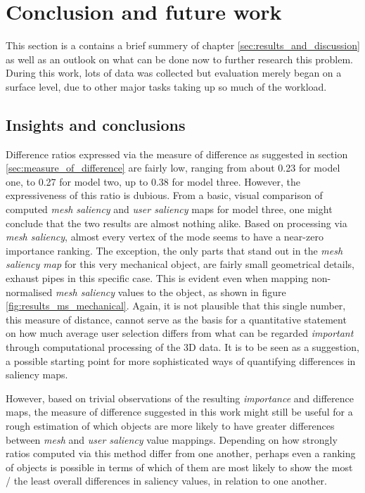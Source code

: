 \chapter{Conclusion and future work}
\label{sec:conclusion_and_future_work}
This section is a contains a brief summery of chapter \ref{sec:results_and_discussion} as well as an outlook on what can be done now to further research this problem. During this work, lots of data was collected but evaluation merely began on a surface level, due to other major tasks taking up so much of the workload.

\section{Insights and conclusions}
\label{insights_and_conclusions}

Difference ratios expressed via the measure of difference as suggested in section \ref{sec:measure_of_difference} are fairly low, ranging from about 0.23 for model one, to 0.27 for model two, up to 0.38 for model three. However, the expressiveness of this ratio is dubious. From a basic, visual comparison of computed \textit{mesh saliency} and \textit{user saliency} maps for model three, one might conclude that the two results are almost nothing alike. Based on processing via \textit{mesh saliency}, almost every vertex of the mode seems to have a near-zero importance ranking. The exception, the only parts that stand out in the \textit{mesh saliency map} for this very mechanical object, are fairly small geometrical details, exhaust pipes in this specific case. This is evident even when mapping non-normalised \textit{mesh saliency} values to the object, as shown in figure \ref{fig:results_ms_mechanical}. Again, it is not plausible that this single number, this measure of distance, cannot serve as the basis for a quantitative statement on how much average user selection differs from what can be regarded \textit{important} through computational processing of the 3D data. It is to be seen as a suggestion, a possible starting point for more sophisticated ways of quantifying differences in saliency maps.

However, based on trivial observations of the resulting \textit{importance} and difference maps, the measure of difference suggested in this work might still be useful for a rough estimation of which objects are more likely to have greater differences between \textit{mesh} and \textit{user saliency} value mappings. Depending on how strongly ratios computed via this method differ from one another, perhaps even a ranking of objects is possible in terms of which of them are most likely to show the most / the least overall differences in saliency values, in relation to one another.

